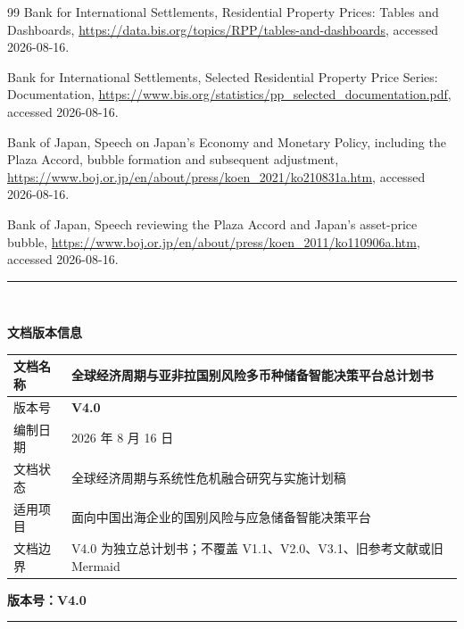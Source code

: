 \documentclass[UTF8,fontset=windows,12pt,openany]{ctexbook}
\begin{document}
\begin{thebibliography}{99}
Bank for International Settlements, Residential Property Prices: Tables and Dashboards, \url{https://data.bis.org/topics/RPP/tables-and-dashboards}, accessed 2026-08-16.

Bank for International Settlements, Selected Residential Property Price Series: Documentation, \url{https://www.bis.org/statistics/pp_selected_documentation.pdf}, accessed 2026-08-16.

Bank of Japan, Speech on Japan's Economy and Monetary Policy, including the Plaza Accord, bubble formation and subsequent adjustment, \url{https://www.boj.or.jp/en/about/press/koen_2021/ko210831a.htm}, accessed 2026-08-16.

Bank of Japan, Speech reviewing the Plaza Accord and Japan's asset-price bubble, \url{https://www.boj.or.jp/en/about/press/koen_2011/ko110906a.htm}, accessed 2026-08-16.

\end{thebibliography}

\clearpage
\thispagestyle{empty}
\begin{center}
  \vspace*{3.2cm}
  {\color{OceanBlue}\rule{0.82\textwidth}{1.4pt}}\\[1.2cm]
  {\Huge\bfseries\color{DeepNavy}文档版本信息\par}
  \vspace{1.4cm}
  \begin{tabular}{p{4.2cm}p{8.0cm}}
    \toprule
    文档名称 & 全球经济周期与亚非拉国别风险多币种储备智能决策平台总计划书\\
    \midrule
    版本号 & \textbf{V4.0}\\
    编制日期 & 2026 年 8 月 16 日\\
    文档状态 & 全球经济周期与系统性危机融合研究与实施计划稿\\
    适用项目 & 面向中国出海企业的国别风险与应急储备智能决策平台\\
    文档边界 & V4.0 为独立总计划书；不覆盖 V1.1、V2.0、V3.1、旧参考文献或旧 Mermaid\\
    \bottomrule
  \end{tabular}
  \vfill
  {\Large\bfseries\color{DeepNavy}版本号：V4.0\par}
  \vspace{1.0cm}
  {\color{OceanBlue}\rule{0.82\textwidth}{1.4pt}}
\end{center}
\end{document}
